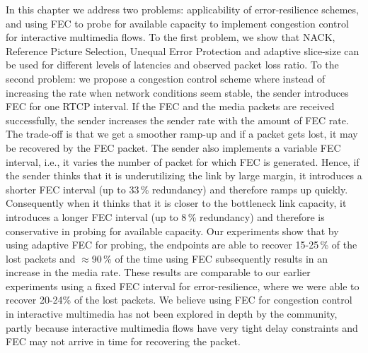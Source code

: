 In this chapter we address two problems: applicability of error-resilience
schemes, and using FEC to probe for available capacity to implement congestion
control for interactive multimedia flows. To the first problem, we show that
NACK, Reference Picture Selection, Unequal Error Protection and adaptive
slice-size can be used for different levels of latencies and observed packet
loss ratio. To the second problem: we propose a congestion control scheme
where instead of increasing the rate when network conditions seem stable, the
sender introduces FEC for one RTCP interval. If the FEC and the media packets
are received successfully, the sender increases the sender rate with the
amount of FEC rate. The trade-off is that we get a smoother ramp-up and if a
packet gets lost, it may be recovered by the FEC packet. The sender also
implements a variable FEC interval, i.e., it varies the number of packet for
which FEC is generated. Hence, if the sender thinks that it is underutilizing
the link by large margin, it introduces a shorter FEC interval (up to 33\,\%
redundancy) and therefore ramps up quickly. Consequently when it thinks that
it is closer to the bottleneck link capacity, it introduces a longer FEC
interval (up to 8\,\% redundancy) and therefore is conservative in probing for
available capacity. Our experiments show that by using adaptive FEC for
probing, the endpoints are able to recover 15-25\,\% of the lost packets and
$\approx$90\,\% of the time using FEC subsequently results in an increase in
the media rate. These results are comparable to our earlier experiments using
a fixed FEC interval for error-resilience, where we were able to recover
20-24\;\% of the lost packets. We believe using FEC for congestion control in
interactive multimedia has not been explored in depth by the community, partly
because interactive multimedia flows have very tight delay constraints and FEC
may not arrive in time for recovering the packet.
